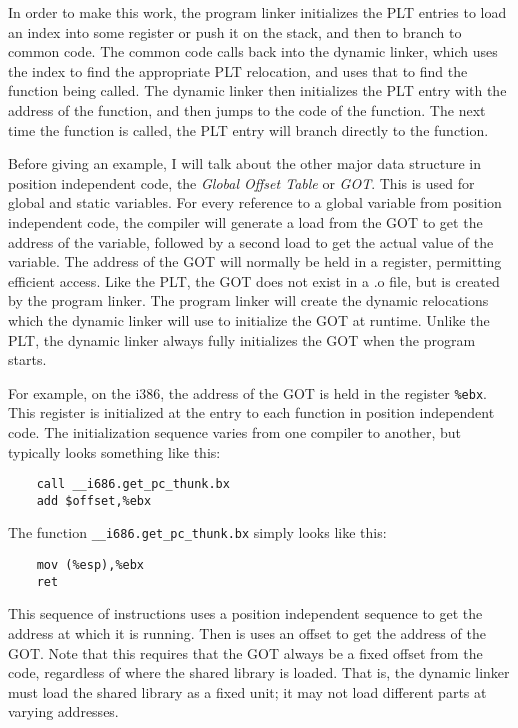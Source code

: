 In order to make this work, the program linker initializes the PLT
entries to load an index into some register or push it on the stack,
and then to branch to common code. The common code calls back into
the dynamic linker, which uses the index to find the appropriate PLT
relocation, and uses that to find the function being called. The dynamic
linker then initializes the PLT entry with the address of the function,
and then jumps to the code of the function. The next time the function
is called, the PLT entry will branch directly to the function.

Before giving an example, I will talk about the other major data
structure in position independent code, the \emph{Global Offset Table}
or \emph{GOT}\@. This is used for global and static variables. For
every reference to a global variable from position independent code,
the compiler will generate a load from the GOT to get the address of
the variable, followed by a second load to get the actual value of the
variable. The address of the GOT will normally be held in a register,
permitting efficient access. Like the PLT, the GOT does not exist in a
.o file, but is created by the program linker. The program linker will
create the dynamic relocations which the dynamic linker will use to
initialize the GOT at runtime. Unlike the PLT, the dynamic linker always
fully initializes the GOT when the program starts.

For example, on the i386, the address of the GOT is held in the register
\texttt{\%ebx}. This register is initialized at the entry to each
function in position independent code. The initialization sequence
varies from one compiler to another, but typically looks something like
this:

\begin{lstlisting}
    call __i686.get_pc_thunk.bx
    add $offset,%ebx
\end{lstlisting}

The function \texttt{\_\_i686.get\_pc\_thunk.bx} simply looks like this:

\begin{lstlisting}
    mov (%esp),%ebx
    ret
\end{lstlisting}

This sequence of instructions uses a position independent sequence to
get the address at which it is running. Then is uses an offset to get
the address of the GOT\@. Note that this requires that the GOT always be
a fixed offset from the code, regardless of where the shared library is
loaded. That is, the dynamic linker must load the shared library as a
fixed unit; it may not load different parts at varying addresses.

